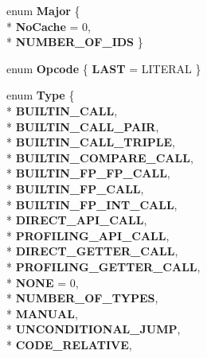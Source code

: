 \begin{DoxyCompactItemize}
\item 
enum {\bfseries Major} \{ \\*
{\bfseries No\+Cache} = 0, 
\\*
{\bfseries N\+U\+M\+B\+E\+R\+\_\+\+O\+F\+\_\+\+I\+DS}
 \}\hypertarget{classv8_1_1internal_1_1_b_a_s_e___e_m_b_e_d_d_e_d_ac2849b502d70e20d5d6567fbd119c8f9}{}\label{classv8_1_1internal_1_1_b_a_s_e___e_m_b_e_d_d_e_d_ac2849b502d70e20d5d6567fbd119c8f9}

\item 
enum {\bfseries Opcode} \{ {\bfseries L\+A\+ST} = L\+I\+T\+E\+R\+AL
 \}\hypertarget{classv8_1_1internal_1_1_b_a_s_e___e_m_b_e_d_d_e_d_a796e8c3cc9a53628565341f982d2afc9}{}\label{classv8_1_1internal_1_1_b_a_s_e___e_m_b_e_d_d_e_d_a796e8c3cc9a53628565341f982d2afc9}

\item 
enum {\bfseries Type} \{ \\*
{\bfseries B\+U\+I\+L\+T\+I\+N\+\_\+\+C\+A\+LL}, 
\\*
{\bfseries B\+U\+I\+L\+T\+I\+N\+\_\+\+C\+A\+L\+L\+\_\+\+P\+A\+IR}, 
\\*
{\bfseries B\+U\+I\+L\+T\+I\+N\+\_\+\+C\+A\+L\+L\+\_\+\+T\+R\+I\+P\+LE}, 
\\*
{\bfseries B\+U\+I\+L\+T\+I\+N\+\_\+\+C\+O\+M\+P\+A\+R\+E\+\_\+\+C\+A\+LL}, 
\\*
{\bfseries B\+U\+I\+L\+T\+I\+N\+\_\+\+F\+P\+\_\+\+F\+P\+\_\+\+C\+A\+LL}, 
\\*
{\bfseries B\+U\+I\+L\+T\+I\+N\+\_\+\+F\+P\+\_\+\+C\+A\+LL}, 
\\*
{\bfseries B\+U\+I\+L\+T\+I\+N\+\_\+\+F\+P\+\_\+\+I\+N\+T\+\_\+\+C\+A\+LL}, 
\\*
{\bfseries D\+I\+R\+E\+C\+T\+\_\+\+A\+P\+I\+\_\+\+C\+A\+LL}, 
\\*
{\bfseries P\+R\+O\+F\+I\+L\+I\+N\+G\+\_\+\+A\+P\+I\+\_\+\+C\+A\+LL}, 
\\*
{\bfseries D\+I\+R\+E\+C\+T\+\_\+\+G\+E\+T\+T\+E\+R\+\_\+\+C\+A\+LL}, 
\\*
{\bfseries P\+R\+O\+F\+I\+L\+I\+N\+G\+\_\+\+G\+E\+T\+T\+E\+R\+\_\+\+C\+A\+LL}, 
\\*
{\bfseries N\+O\+NE} = 0, 
\\*
{\bfseries N\+U\+M\+B\+E\+R\+\_\+\+O\+F\+\_\+\+T\+Y\+P\+ES}, 
\\*
{\bfseries M\+A\+N\+U\+AL}, 
\\*
{\bfseries U\+N\+C\+O\+N\+D\+I\+T\+I\+O\+N\+A\+L\+\_\+\+J\+U\+MP}, 
\\*
{\bfseries C\+O\+D\+E\+\_\+\+R\+E\+L\+A\+T\+I\+VE}, 

\end{DoxyCompactItemize}
